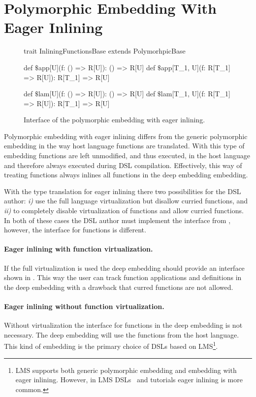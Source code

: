 \section{Polymorphic Embedding With Eager Inlining}
\label{sec:polymorphic-embedding-with-eager-inlining}
\begin{figure}
\begin{listingtiny}
trait InliningFunctionsBase extends PolymorhpicBase {
  def $\$$app[U](f: () => R[U]): () => R[U]
  def $\$$app[T_1, U](f: R[T_1] => R[U]): R[T_1] => R[U]

  def $\$$lam[U](f: () => R[U]): () => R[U]
  def $\$$lam[T_1, U](f: R[T_1] => R[U]): R[T_1] => R[U]
}
\end{listingtiny}
\caption{Interface of the polymorphic embedding with eager inlining.}
\label{fig:polymorphic-embedding-with-eager-inlining}
\end{figure}

Polymorphic embedding with eager inlining differs from the generic polymorphic embedding in
the way host language functions are translated. With this type of embedding functions
are left unmodified, and thus executed, in the host language and therefore always executed during DSL compilation. Effectively,
this way of treating functions always inlines all functions in the deep embedding embedding.

With the type translation for eager inlining there two possibilities for the DSL author:
\emph{i)} use the full language virtualization but disallow curried functions, and
\emph{ii)} to completely disable virtualization of functions and allow curried functions.
 In both of these cases the DSL author must implement the interface 
 from , however, the interface for functions is different.

\paragraph{Eager inlining with function virtualization.} If the full virtualization
is used the deep embedding should provide an interface shown in . This way the user can track function applications and definitions in the deep embedding with
a drawback that curred functions are not allowed.

\paragraph{Eager inlining without function virtualization.} Without virtualization the interface
for functions in the deep embedding is not necessary. The deep embedding will use the
functions from the host language. This kind of embedding is the primary choice of DSLs based on LMS\footnote{LMS supports both generic polymorphic embedding and embedding with eager inlining. However, in LMS DSLs~\cite{rompf2012lightweight} and tutorials eager inlining is more common.}.

